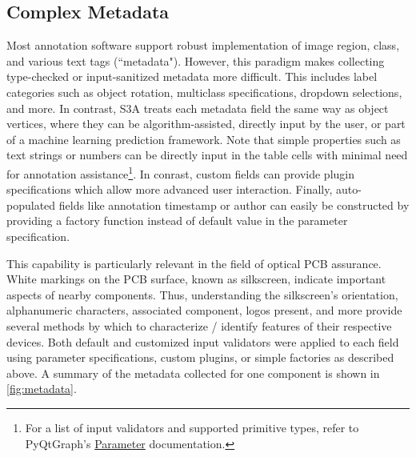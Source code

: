 \subsection{Complex Metadata}
Most annotation software support robust implementation of image region, class, and various text tags (``metadata").
However, this paradigm makes collecting type-checked or input-sanitized metadata more difficult.
This includes label categories such as object rotation, multiclass specifications, dropdown selections, and more.
In contrast, S3A treats each metadata field the same way as object vertices, where they can be algorithm-assisted, directly input by the user, or part of a machine learning prediction framework.
Note that simple properties such as text strings or numbers can be directly input in the table cells with minimal need for annotation assistance\footnote{For a list of input validators and supported primitive types, refer to PyQtGraph's \href{https://pyqtgraph.readthedocs.io/en/latest/parametertree/parametertypes.html}{Parameter} documentation.}.
In conrast, custom fields can provide plugin specifications which allow more advanced user interaction.
Finally, auto-populated fields like annotation timestamp or author can easily be constructed by providing a factory function instead of default value in the parameter specification.

This capability is particularly relevant in the field of optical PCB assurance.
White markings on the PCB surface, known as silkscreen, indicate important aspects of nearby components.
Thus, understanding the silkscreen's orientation, alphanumeric characters, associated component, logos present, and more provide several methods by which to characterize / identify features of their respective devices.
Both default and customized input validators were applied to each field using parameter specifications, custom plugins, or simple factories as described above.
A summary of the metadata collected for one component is shown in \autoref{fig:metadata}.

\makeMetadataFig
